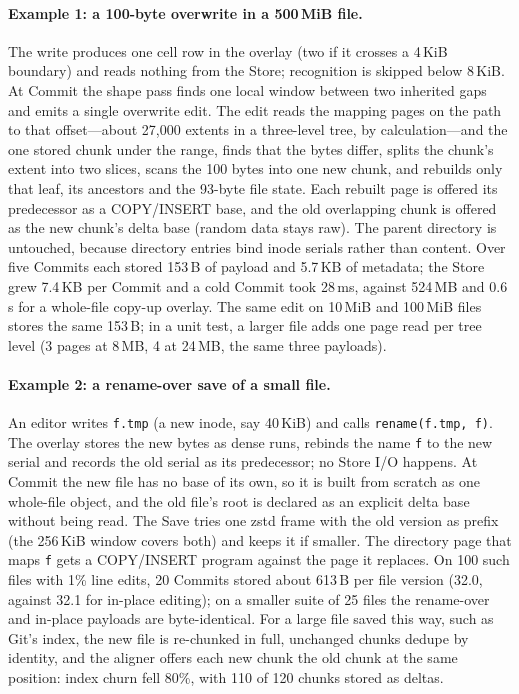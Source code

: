 \paragraph{Example 1: a 100-byte overwrite in a 500\,MiB file.} The write produces one
cell row in the overlay (two if it crosses a 4\,KiB boundary) and reads nothing from the
Store; recognition is skipped below 8\,KiB. At Commit the shape pass finds one local
window between two inherited gaps and emits a single overwrite edit. The edit reads the
mapping pages on the path to that offset---about 27,000 extents in a three-level tree,
by calculation---and the one stored chunk under the range, finds that the bytes differ,
splits the chunk's extent into two slices, scans the 100 bytes into one new chunk, and
rebuilds only that leaf, its ancestors and the 93-byte file state. Each rebuilt page is
offered its predecessor as a COPY/INSERT base, and the old overlapping chunk is offered
as the new chunk's delta base (random data stays raw). The parent directory is
untouched, because directory entries bind inode serials rather than content. Over five
Commits each stored 153\,B of payload and 5.7\,KB of metadata; the Store grew 7.4\,KB per
Commit and a cold Commit took 28\,ms, against 524\,MB and 0.6\,s for a whole-file
copy-up overlay. The same edit on 10\,MiB and 100\,MiB files stores the same 153\,B; in a
unit test, a larger file adds one page read per tree level (3 pages at 8\,MB, 4 at
24\,MB, the same three payloads).

\paragraph{Example 2: a rename-over save of a small file.} An editor writes
\texttt{f.tmp} (a new inode, say 40\,KiB) and calls \texttt{rename(f.tmp, f)}. The overlay
stores the new bytes as dense runs, rebinds the name \texttt{f} to the new serial and
records the old serial as its predecessor; no Store I/O happens. At Commit the new file
has no base of its own, so it is built from scratch as one whole-file object, and the
old file's root is declared as an explicit delta base without being read. The Save tries
one zstd frame with the old version as prefix (the 256\,KiB window covers both) and keeps
it if smaller. The directory page that maps \texttt{f} gets a COPY/INSERT program against
the page it replaces. On 100 such files with 1\% line edits, 20 Commits stored about
613\,B per file version (32.0\X{}, against 32.1\X{} for in-place editing); on a smaller
suite of 25 files the rename-over and in-place payloads are byte-identical. For a large
file saved this way, such as Git's index, the new file is re-chunked in full, unchanged
chunks dedupe by identity, and the aligner offers each new chunk the old chunk at the
same position: index churn fell 80\%, with 110 of 120 chunks stored as deltas.

